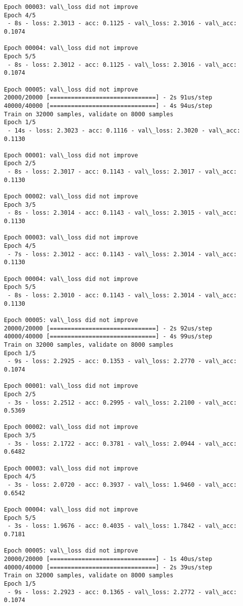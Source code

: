 \documentclass[11pt]{article}
\begin{document}
\begin{Verbatim}[commandchars=\\\{\}]
Epoch 00003: val\_loss did not improve
Epoch 4/5
 - 8s - loss: 2.3013 - acc: 0.1125 - val\_loss: 2.3016 - val\_acc: 0.1074

Epoch 00004: val\_loss did not improve
Epoch 5/5
 - 8s - loss: 2.3012 - acc: 0.1125 - val\_loss: 2.3016 - val\_acc: 0.1074

Epoch 00005: val\_loss did not improve
20000/20000 [==============================] - 2s 91us/step
40000/40000 [==============================] - 4s 94us/step
Train on 32000 samples, validate on 8000 samples
Epoch 1/5
 - 14s - loss: 2.3023 - acc: 0.1116 - val\_loss: 2.3020 - val\_acc: 0.1130

Epoch 00001: val\_loss did not improve
Epoch 2/5
 - 8s - loss: 2.3017 - acc: 0.1143 - val\_loss: 2.3017 - val\_acc: 0.1130

Epoch 00002: val\_loss did not improve
Epoch 3/5
 - 8s - loss: 2.3014 - acc: 0.1143 - val\_loss: 2.3015 - val\_acc: 0.1130

Epoch 00003: val\_loss did not improve
Epoch 4/5
 - 7s - loss: 2.3012 - acc: 0.1143 - val\_loss: 2.3014 - val\_acc: 0.1130

Epoch 00004: val\_loss did not improve
Epoch 5/5
 - 8s - loss: 2.3010 - acc: 0.1143 - val\_loss: 2.3014 - val\_acc: 0.1130

Epoch 00005: val\_loss did not improve
20000/20000 [==============================] - 2s 92us/step
40000/40000 [==============================] - 4s 99us/step
Train on 32000 samples, validate on 8000 samples
Epoch 1/5
 - 9s - loss: 2.2925 - acc: 0.1353 - val\_loss: 2.2770 - val\_acc: 0.1074

Epoch 00001: val\_loss did not improve
Epoch 2/5
 - 3s - loss: 2.2512 - acc: 0.2995 - val\_loss: 2.2100 - val\_acc: 0.5369

Epoch 00002: val\_loss did not improve
Epoch 3/5
 - 3s - loss: 2.1722 - acc: 0.3781 - val\_loss: 2.0944 - val\_acc: 0.6482

Epoch 00003: val\_loss did not improve
Epoch 4/5
 - 3s - loss: 2.0720 - acc: 0.3937 - val\_loss: 1.9460 - val\_acc: 0.6542

Epoch 00004: val\_loss did not improve
Epoch 5/5
 - 3s - loss: 1.9676 - acc: 0.4035 - val\_loss: 1.7842 - val\_acc: 0.7181

Epoch 00005: val\_loss did not improve
20000/20000 [==============================] - 1s 40us/step
40000/40000 [==============================] - 2s 39us/step
Train on 32000 samples, validate on 8000 samples
Epoch 1/5
 - 9s - loss: 2.2923 - acc: 0.1365 - val\_loss: 2.2772 - val\_acc: 0.1074


\end{Verbatim}
\end{document}
